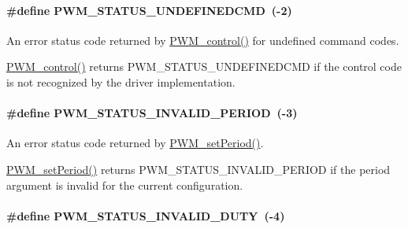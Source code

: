 \paragraph[{P\+W\+M\+\_\+\+S\+T\+A\+T\+U\+S\+\_\+\+U\+N\+D\+E\+F\+I\+N\+E\+D\+C\+M\+D}]{\setlength{\rightskip}{0pt plus 5cm}\#define P\+W\+M\+\_\+\+S\+T\+A\+T\+U\+S\+\_\+\+U\+N\+D\+E\+F\+I\+N\+E\+D\+C\+M\+D~(-\/2)}\label{_p_w_m_8h_afed58384f49ce364218eeaabb0858bea}


An error status code returned by \hyperlink{_p_w_m_8h_ade999f5b12997479efa1ac85aaf46ef5}{P\+W\+M\+\_\+control()} for undefined command codes. 

\hyperlink{_p_w_m_8h_ade999f5b12997479efa1ac85aaf46ef5}{P\+W\+M\+\_\+control()} returns P\+W\+M\+\_\+\+S\+T\+A\+T\+U\+S\+\_\+\+U\+N\+D\+E\+F\+I\+N\+E\+D\+C\+M\+D if the control code is not recognized by the driver implementation. 
\paragraph[{P\+W\+M\+\_\+\+S\+T\+A\+T\+U\+S\+\_\+\+I\+N\+V\+A\+L\+I\+D\+\_\+\+P\+E\+R\+I\+O\+D}]{\setlength{\rightskip}{0pt plus 5cm}\#define P\+W\+M\+\_\+\+S\+T\+A\+T\+U\+S\+\_\+\+I\+N\+V\+A\+L\+I\+D\+\_\+\+P\+E\+R\+I\+O\+D~(-\/3)}\label{_p_w_m_8h_a5541b99566b02450b1d44b3bf0c344bc}


An error status code returned by \hyperlink{_p_w_m_8h_ae40714354f46dd6d30dbfb14473c73e0}{P\+W\+M\+\_\+set\+Period()}. 

\hyperlink{_p_w_m_8h_ae40714354f46dd6d30dbfb14473c73e0}{P\+W\+M\+\_\+set\+Period()} returns P\+W\+M\+\_\+\+S\+T\+A\+T\+U\+S\+\_\+\+I\+N\+V\+A\+L\+I\+D\+\_\+\+P\+E\+R\+I\+O\+D if the period argument is invalid for the current configuration. 
\paragraph[{P\+W\+M\+\_\+\+S\+T\+A\+T\+U\+S\+\_\+\+I\+N\+V\+A\+L\+I\+D\+\_\+\+D\+U\+T\+Y}]{\setlength{\rightskip}{0pt plus 5cm}\#define P\+W\+M\+\_\+\+S\+T\+A\+T\+U\+S\+\_\+\+I\+N\+V\+A\+L\+I\+D\+\_\+\+D\+U\+T\+Y~(-\/4)}\label{_p_w_m_8h_ac3b90551ab071520eccaabe4cabe1f1a}


